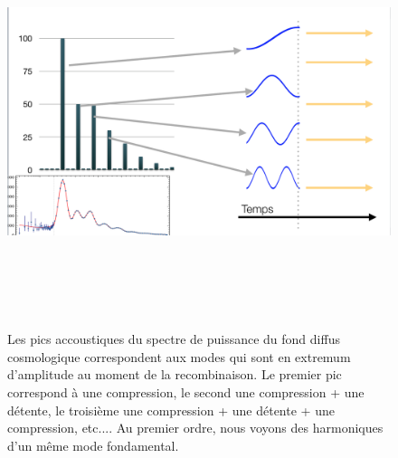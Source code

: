 \begin{figure}[htbp]
	\centering
		\includegraphics[height=12cm]{figs/bao2.png}
	\caption{Les pics accoustiques du spectre de puissance du fond diffus cosmologique correspondent aux modes qui sont en extremum d'amplitude au moment de la recombinaison. Le premier pic correspond à une compression, le second une compression + une détente, le troisième une compression + une détente + une compression, etc.... Au premier ordre, nous voyons des harmoniques d'un même mode fondamental. }
	\label{f:bao2}
\end{figure}

